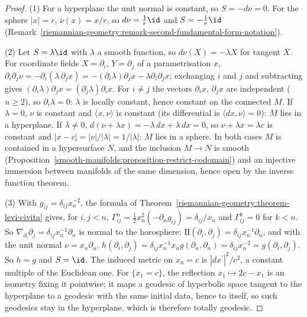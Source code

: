 \begin{proof}
(1) For a hyperplane the unit normal is constant, so $S = -d\nu = 0$. For the sphere $|x| = r$, $\nu(x) = x/r$, so $d\nu = \frac1r\id$ and $S = -\frac1r\id$
(Remark~\ref{riemannian-geometry:remark-second-fundamental-form-notation}).

(2) Let $S = \lambda\id$ with $\lambda$ a smooth function, so $d\nu(X) = -\lambda X$ for tangent $X$. For coordinate fields $X = \partial_i$, $Y = \partial_j$ of a parametrisation $x$,
$\partial_i\partial_j\nu = -\partial_i(\lambda\,\partial_jx) = -(\partial_i\lambda)\partial_jx - \lambda\partial_i\partial_jx$; exchanging $i$ and $j$ and subtracting gives
$(\partial_i\lambda)\partial_jx = (\partial_j\lambda)\partial_ix$. For $i \neq j$ the vectors $\partial_ix$, $\partial_jx$ are independent ($n \geq 2$), so $\partial_i\lambda = 0$: $\lambda$ is locally constant,
hence constant on the connected $M$. If $\lambda = 0$, $\nu$ is constant and $\langle x, \nu\rangle$ is constant (its differential is $\langle dx, \nu\rangle = 0$): $M$ lies in a hyperplane. If $\lambda \neq 0$,
$d(\nu + \lambda x) = -\lambda\,dx + \lambda\,dx = 0$, so $\nu + \lambda x = \lambda c$ is constant and $|x - c| = |\nu|/|\lambda| = 1/|\lambda|$: $M$ lies in a sphere. In both cases $M$ is contained in a hypersurface $N$, and the inclusion
$M \to N$ is smooth (Proposition~\ref{smooth-manifolds:proposition-restrict-codomain}) and an injective immersion between manifolds of the same dimension, hence open by the inverse function theorem.

(3) With $g_{ij} = \delta_{ij}x_n^{-2}$, the formula of Theorem~\ref{riemannian-geometry:theorem-levi-civita} gives, for $i, j < n$, $\Gamma^n_{ij} = \frac12x_n^2(-\partial_ng_{ij}) = \delta_{ij}/x_n$ and
$\Gamma^k_{ij} = 0$ for $k < n$. So $\nabla_{\partial_i}\partial_j = \delta_{ij}x_n^{-1}\partial_n$ is normal to the horosphere: $\mathrm{II}(\partial_i, \partial_j) = \delta_{ij}x_n^{-1}\partial_n$, and with the unit
normal $\nu = x_n\partial_n$, $h(\partial_i, \partial_j) = \delta_{ij}x_n^{-1}x_ng(\partial_n, \partial_n) = \delta_{ij}x_n^{-2} = g(\partial_i, \partial_j)$. So $h = g$ and $S = \id$. The induced metric on
$x_n = c$ is $|dx^{\prime}|^2/c^2$, a constant multiple of the Euclidean one. For $\{x_1 = c\}$, the reflection $x_1 \mapsto 2c - x_1$ is an isometry fixing it pointwise; it maps a geodesic of
hyperbolic space tangent to the hyperplane to a geodesic with the same initial data, hence to itself, so such geodesics stay in the hyperplane, which is therefore totally geodesic.
\end{proof}

